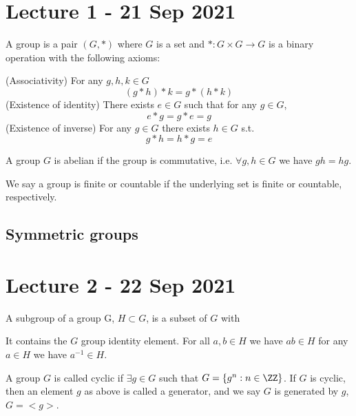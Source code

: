 \documentclass[11pt]{scrartcl}
\begin{document}
\section{Lecture 1 - 21 Sep 2021}

\begin{definition}
  A group is a pair $(G,*)$ where $G$ is a set and $*:G\times G\to G$ is a binary
  operation with the following axioms:
  \begin{itemize}
      \ii (Associativity) For any $g,h,k\in G$
      \[(g*h)*k = g*(h*k)\]
      \ii (Existence of identity) There exists $e\in G$ such that for any $g\in G$,
      \[e*g=g*e = g\]
      \ii (Existence of inverse) For any $g\in G$ there exists $h\in G$ s.t.
      \[g*h=h*g=e\]
  \end{itemize}
  \label{group}
\end{definition}

\begin{definition}
  A group $G$ is abelian if the group is commutative, i.e. $\forall g,h\in G$ we have
  $gh=hg$.
  \label{abelianGroup}
\end{definition}

\begin{definition}
  We say a group is finite or countable if the underlying set is finite or countable,
  respectively.
\end{definition}

\subsection{Symmetric groups}

\section{Lecture 2 - 22 Sep 2021}

\begin{definition}
   A subgroup of a group G, $H\subset G$, is a subset of $G$ with
   \begin{itemize}
       \ii It contains the $G$ group identity element.
       \ii For all $a,b\in H$ we have $ab\in H$
       \ii for any $a\in H$ we have $a^{-1}\in H$.
   \end{itemize}
   \label{subgroup}
 
\end{definition}

\begin{definition}
  A group $G$ is called cyclic if $\exists g\in G$ such that $G=\left\{ g^n : n\in\ZZ
  \right\}$. If $G$ is cyclic, then an element $g$ as above is called a generator, and we
  say $G$ is generated by $g$, $G=<g>$.
  \label{cyclicGroup}
\end{definition}
\end{document}

